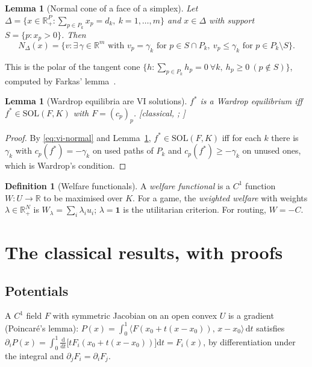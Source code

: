 \documentclass[11pt,a4paper]{article}
\theoremstyle{plain}
\newtheorem{lemma}[theorem]{Lemma}
\theoremstyle{definition}
\newtheorem{definition}[theorem]{Definition}
\theoremstyle{remark}
\newcommand{\R}{\mathbb{R}}
\newcommand{\SOL}{\mathrm{SOL}}
\newcommand{\NC}{N}
\newcommand{\dd}{\mathrm{d}}
\newcommand{\ip}[2]{\langle #1,\,#2\rangle}
\newcommand{\status}[1]{\textsf{\small [#1]}}
\begin{document}
\begin{lemma}[Normal cone of a face of a simplex]\label{lem:simplex}
Let $\Delta=\{x\in\R^P_+:\sum_{p\in P_k}x_p=d_k,\ k=1,\dots,m\}$ and $x\in\Delta$ with support $S=\{p:x_p>0\}$. Then
\[
\NC_\Delta(x)=\{v: \exists\,\gamma\in\R^m \text{ with } v_p=\gamma_k \text{ for } p\in S\cap P_k,\ v_p\le\gamma_k \text{ for } p\in P_k\setminus S\}.
\]
\end{lemma}
This is the polar of the tangent cone $\{h:\sum_{p\in P_k}h_p=0\ \forall k,\ h_p\ge0\ (p\notin S)\}$, computed by Farkas' lemma~\citep{rockafellar1970}.

\begin{lemma}[Wardrop equilibria are VI solutions]\label{lem:wardrop}
$f^*$ is a Wardrop equilibrium iff $f^*\in\SOL(F,K)$ with $F=(c_p)_p$. \status{classical, \citealp{smith1979}; \citealp{dafermos1980}}
\end{lemma}
\begin{proof}
By \eqref{eq:vi-normal} and Lemma~\ref{lem:simplex}, $f^*\in\SOL(F,K)$ iff for each $k$ there is $\gamma_k$ with $c_p(f^*)=-\gamma_k$ on used paths of $P_k$ and $c_p(f^*)\ge-\gamma_k$ on unused ones, which is Wardrop's condition.
\end{proof}

\begin{definition}[Welfare functionals]
A \emph{welfare functional} is a $C^1$ function $W\colon U\to\R$ to be maximised over $K$. For a game, the \emph{weighted welfare} with weights $\lambda\in\R^N_+$ is $W_\lambda=\sum_i\lambda_iu_i$; $\lambda=\mathbf 1$ is the utilitarian criterion. For routing, $W=-C$.
\end{definition}

\section{The classical results, with proofs}\label{sec:classical}

\subsection{Potentials}

A $C^1$ field $F$ with symmetric Jacobian on an open convex $U$ is a gradient (Poincar\'e's lemma): $P(x)=\int_0^1\ip{F(x_0+t(x-x_0))}{x-x_0}\,\dd t$ satisfies $\partial_iP(x)=\int_0^1\frac{\dd}{\dd t}\big[tF_i(x_0+t(x-x_0))\big]\dd t=F_i(x)$, by differentiation under the integral and $\partial_jF_i=\partial_iF_j$.
\end{document}
